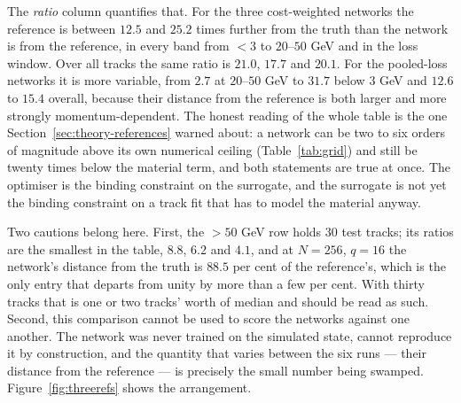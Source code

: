 \documentclass[11pt,a4paper]{article}
\begin{document}
The \emph{ratio} column quantifies that. For the three cost-weighted networks
the reference is between $12.5$ and $25.2$ times further from the truth than the
network is from the reference, in every band from $<3$ to $20$--$50$ GeV and in
the loss window. Over all tracks the same ratio is $21.0$, $17.7$ and $20.1$.
For the pooled-loss networks it is more variable, from $2.7$ at $20$--$50$ GeV
to $31.7$ below $3$ GeV and $12.6$ to $15.4$ overall, because their distance
from the reference is both larger and more strongly momentum-dependent. The honest reading of the whole table is the one
Section~\ref{sec:theory-references} warned about: a network can be two to six
orders of magnitude above its own numerical ceiling
(Table~\ref{tab:grid}) and still be twenty times below the material term, and
both statements are true at once. The optimiser is the binding constraint on the
surrogate, and the surrogate is not yet the binding constraint on a track fit
that has to model the material anyway.

Two cautions belong here. First, the $>50$ GeV row holds $30$ test tracks; its
ratios are the smallest in the table, $8.8$, $6.2$ and $4.1$, and at $N = 256$,
$q = 16$ the network's distance from the truth is $88.5$ per cent of the
reference's, which is the only entry that departs from unity by more than a few
per cent. With thirty tracks that is one or two tracks' worth of median and
should be read as such. Second, this comparison cannot be used to score the
networks against one another. The network was never trained on the simulated
state, cannot reproduce it by construction, and the quantity that varies between
the six runs --- their distance from the reference --- is precisely the small
number being swamped. Figure~\ref{fig:threerefs} shows the arrangement.
\end{document}
